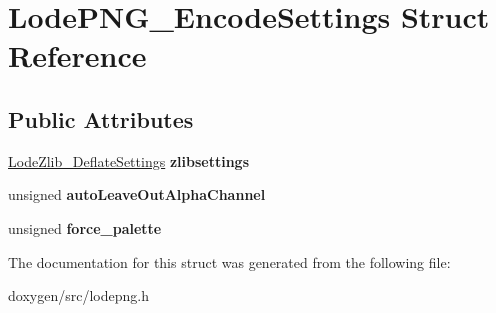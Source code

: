 \hypertarget{struct_lode_p_n_g___encode_settings}{}\section{Lode\+P\+N\+G\+\_\+\+Encode\+Settings Struct Reference}
\label{struct_lode_p_n_g___encode_settings}
\subsection*{Public Attributes}
\begin{DoxyCompactItemize}
\item 
\mbox{\label{struct_lode_p_n_g___encode_settings_addba4b351da6bace64c02a264be74f53}} 
\mbox{\hyperlink{struct_lode_zlib___deflate_settings}{Lode\+Zlib\+\_\+\+Deflate\+Settings}} {\bfseries zlibsettings}
\item 
\mbox{\label{struct_lode_p_n_g___encode_settings_a5074182840fae2ac4399ca9fa6660b41}} 
unsigned {\bfseries auto\+Leave\+Out\+Alpha\+Channel}
\item 
\mbox{\label{struct_lode_p_n_g___encode_settings_a44de1047cd9f3bfd55bf8c5313620065}} 
unsigned {\bfseries force\+\_\+palette}
\end{DoxyCompactItemize}


The documentation for this struct was generated from the following file\+:\begin{DoxyCompactItemize}
\item 
doxygen/src/lodepng.\+h\end{DoxyCompactItemize}
